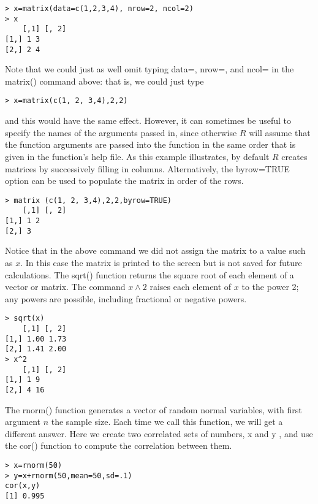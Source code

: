\documentclass[10pt]{article}
\begin{document}
\begin{verbatim}
> x=matrix(data=c(1,2,3,4), nrow=2, ncol=2)
> x
    [,1] [, 2]
[1,] 1 3
[2,] 2 4
\end{verbatim}

Note that we could just as well omit typing data=, nrow=, and ncol= in the matrix() command above: that is, we could just type

\begin{verbatim}
> x=matrix(c(1, 2, 3,4),2,2)
\end{verbatim}

and this would have the same effect. However, it can sometimes be useful to specify the names of the arguments passed in, since otherwise $R$ will assume that the function arguments are passed into the function in the same order that is given in the function's help file. As this example illustrates, by default $R$ creates matrices by successively filling in columns. Alternatively, the byrow=TRUE option can be used to populate the matrix in order of the rows.

\begin{verbatim}
> matrix (c(1, 2, 3,4),2,2,byrow=TRUE)
    [,1] [, 2]
[1,] 1 2
[2,] 3
\end{verbatim}

Notice that in the above command we did not assign the matrix to a value such as $x$. In this case the matrix is printed to the screen but is not saved for future calculations. The sqrt() function returns the square root of each element of a vector or matrix. The command $x \wedge 2$ raises each element of $x$ to the power 2; any powers are possible, including fractional or negative powers.

\begin{verbatim}
> sqrt(x)
    [,1] [, 2]
[1,] 1.00 1.73
[2,] 1.41 2.00
> x^2
    [,1] [, 2]
[1,] 1 9
[2,] 4 16
\end{verbatim}

The rnorm() function generates a vector of random normal variables, with first argument $n$ the sample size. Each time we call this function, we will get a different answer. Here we create two correlated sets of numbers, x and y , and use the cor() function to compute the correlation between them.


\begin{verbatim}
> x=rnorm(50)
> y=x+rnorm(50,mean=50,sd=.1)
cor(x,y)
[1] 0.995
\end{verbatim}
\end{document}
